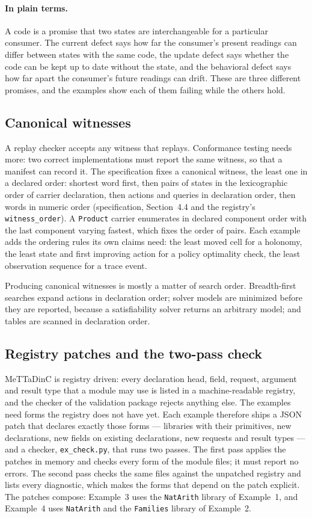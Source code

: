 \documentclass[11pt]{article}
\newcommand{\fpath}[1]{\nolinkurl{#1}}
\newcommand{\code}[1]{\texttt{#1}}
\newcommand{\plain}{\paragraph{In plain terms.}}
\newcommand{\spec}[1]{specification, Section~#1}
\theoremstyle{definition}
\theoremstyle{plain}
\begin{document}
\plain A code is a promise that two states are interchangeable for a particular consumer. The
current defect says how far the consumer's present readings can differ between states with the
same code, the update defect says whether the code can be kept up to date without the state, and
the behavioral defect says how far apart the consumer's future readings can drift. These are three
different promises, and the examples show each of them failing while the others hold.

\subsection{Canonical witnesses}\label{sec:canonical}

A replay checker accepts any witness that replays. Conformance testing needs more: two correct
implementations must report the same witness, so that a manifest can record it. The specification
fixes a canonical witness, the least one in a declared order: shortest word first, then pairs of
states in the lexicographic order of carrier declaration, then actions and queries in declaration
order, then words in numeric order (\spec{4.4} and the registry's \code{witness\_order}). A
\code{Product} carrier enumerates in declared component order with the last component varying
fastest, which fixes the order of pairs. Each example adds the ordering rules its own claims need:
the least moved cell for a holonomy, the least state and first improving action for a policy
optimality check, the least observation sequence for a trace event.

Producing canonical witnesses is mostly a matter of search order. Breadth-first searches expand
actions in declaration order; solver models are minimized before they are reported, because a
satisfiability solver returns an arbitrary model; and tables are scanned in declaration order.

\subsection{Registry patches and the two-pass check}\label{sec:patches}

MeTTaDinC is registry driven: every declaration head, field, request, argument and result type that
a module may use is listed in a machine-readable registry, and the checker of the validation
package rejects anything else. The examples need forms the registry does not have yet. Each example
therefore ships a JSON patch that declares exactly those forms --- libraries with their primitives,
new declarations, new fields on existing declarations, new requests and result types --- and a
checker, \fpath{ex_check.py}, that runs two passes. The first pass applies the patches in memory
and checks every form of the module files; it must report no errors. The second pass checks the same
files against the unpatched registry and lists every diagnostic, which makes the forms that depend
on the patch explicit. The patches compose: Example~3 uses the \code{NatArith} library of
Example~1, and Example~4 uses \code{NatArith} and the \code{Families} library of Example~2.
\end{document}
